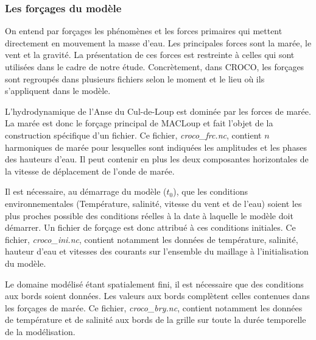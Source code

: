 \documentclass[10pt,a4paper,titlepage]{article}
\begin{document}

\subsubsection{Les forçages du modèle}
\label{subsub:forcages}
On entend par forçages les phénomènes et les forces primaires qui mettent directement en mouvement la masse d'eau.
Les principales forces sont la marée, le vent et la gravité.
La présentation de ces forces est restreinte à celles qui sont utilisées dans le cadre de notre étude.
Concrètement, dans CROCO, les forçages sont regroupés dans plusieurs fichiers selon le moment et le lieu où ils s'appliquent dans le modèle.

L'hydrodynamique de l'Anse du Cul-de-Loup est dominée par les forces de marée. 
La marée est donc le forçage principal de MACLoup et fait l'objet de la construction spécifique d'un fichier.
Ce fichier, \textit{croco\_frc.nc}, contient $n$ harmoniques de marée pour lesquelles sont indiquées les amplitudes et les phases des hauteurs d'eau. Il peut contenir en plus les deux composantes horizontales de la vitesse de déplacement de l'onde de marée.

Il est nécessaire, au démarrage du modèle ($t_0$), que les conditions environnementales (Température, salinité, vitesse du vent et de l'eau) soient les plus proches possible des conditions réelles à la date à laquelle le modèle doit démarrer.
Un fichier de forçage est donc attribué à ces conditions initiales.
Ce fichier, \textit{croco\_ini.nc}, contient notamment les données de température, salinité, hauteur d'eau et vitesses des courants sur l'ensemble du maillage à l'initialisation du modèle.

Le domaine modélisé étant spatialement fini, il est nécessaire que des conditions aux bords soient données.
Les valeurs aux bords complètent celles contenues dans les forçages de marée.
Ce fichier, \textit{croco\_bry.nc}, contient notamment les données de température et de salinité %
aux bords de la grille sur toute la durée temporelle de la modélisation.
\end{document}
